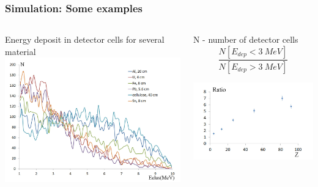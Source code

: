 \documentclass[11pt]{beamer}
\begin{document}
\begin{frame}
    \frametitle{Simulation: Some examples}
    \begin{columns}
        \begin{column}{0.5\textwidth}
            Energy deposit in detector cells for several material\\
            \includegraphics[width=1\textwidth]{figures/sim_1.jpeg}
            
        \end{column}
        \begin{column}{0.5\textwidth}
            N - number of detector cells
            $$
           \frac{N[E_{dep} < 3~MeV]}
            {N[E_{dep} > 3~MeV]}
            $$
       
            \includegraphics[width=1\textwidth]{figures/sim_2.jpeg}
        \end{column}
    \end{columns}  
\end{frame}
\end{document}
